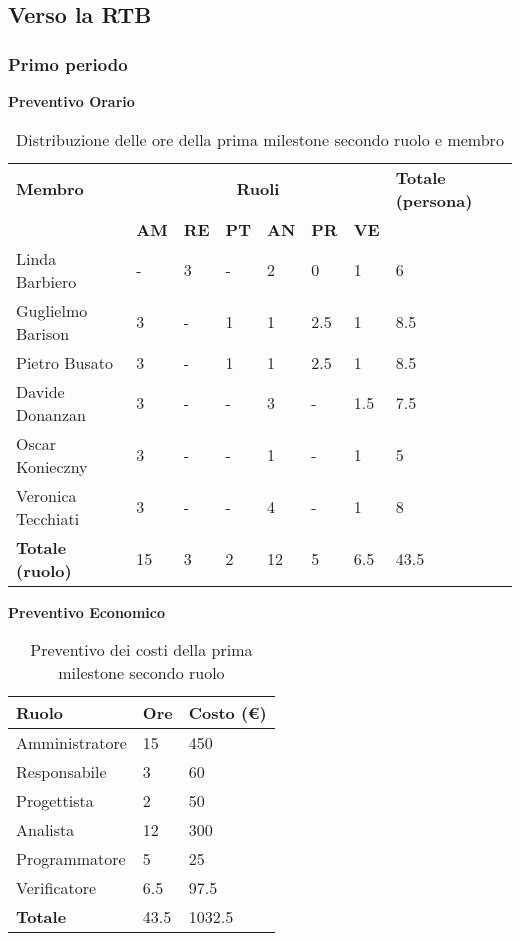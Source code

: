 \subsection{Verso la RTB}
\subsubsection{Primo periodo}
\textbf{Preventivo Orario}
\begin{table}[ht!]
	\centering
	\begin{tabular}{p{4cm} p{1cm} p{1cm} p{1cm} p{1cm} p{1cm} p{1cm} p{3cm}}
		\toprule
        \textbf{Membro} & \multicolumn{6}{c}{\textbf{Ruoli}} & \textbf{Totale (persona)}\\
		& \textbf{AM} & \textbf{RE} & \textbf{PT} & \textbf{AN} & \textbf{PR} & \textbf{VE}\\
		\midrule
        Linda Barbiero          & -     & 3     & -     & 2     & 0     & 1     & 6 \\
        Guglielmo Barison       & 3     & -     & 1     & 1     & 2.5   & 1     & 8.5\\
        Pietro Busato           & 3     & -     & 1     & 1     & 2.5   & 1     & 8.5 \\
        Davide Donanzan         & 3     & -     & -     & 3     & -     & 1.5   & 7.5 \\
        Oscar Konieczny         & 3     & -     & -     & 1     & -     & 1     & 5 \\
        Veronica Tecchiati      & 3     & -     & -     & 4     & -     & 1     & 8 \\
        \bottomrule
        \textbf{Totale (ruolo)} & 15     & 3     & 2     & 12   & 5     & 6.5   & 43.5 \\
	\end{tabular}
	\caption{Distribuzione delle ore della prima milestone secondo ruolo e membro}
	\label{table:Distribuzione delle ore della prima milestone secondo ruolo e membro}
\end{table}
\newpage
\textbf{Preventivo Economico}
\begin{table}[ht!]
	\centering
	\begin{tabular}{p{4cm} p{1cm} p{2cm}}
        \toprule
        \textbf{Ruolo} & \textbf{Ore} & \textbf{Costo (€)} \\
        \midrule
        Amministratore & 15 & 450 \\
        Responsabile & 3 & 60 \\
        Progettista & 2 & 50 \\
        Analista & 12 & 300 \\
        Programmatore & 5 & 25 \\
        Verificatore & 6.5 & 97.5 \\
        \bottomrule
        \textbf{Totale} & 43.5 & 1032.5
    \end{tabular}
    \caption{Preventivo dei costi della prima milestone secondo ruolo}
	\label{table:Preventivo dei costi della prima milestone secondo ruolo}
\end{table}

